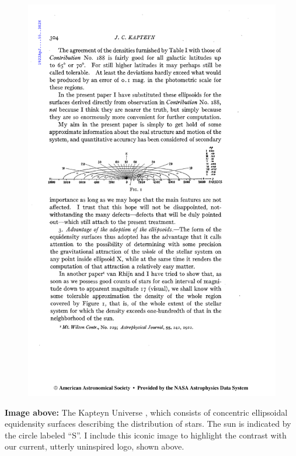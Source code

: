 \begin{figure}[htbp!]
  \centering
  \includegraphics[width=\textwidth]{ch_frontandback/img/kapteynuniverse.pdf}
\end{figure}

\vfill

\textbf{Image above:}
The Kapteyn Universe \citep{1922ApJ....55..302K}, which consists of concentric ellipsoidal equidensity surfaces describing the distribution of stars.
The sun is indicated by the circle labeled ``S''.
I include this iconic image to highlight the contrast with our current, utterly uninspired logo, shown above.

